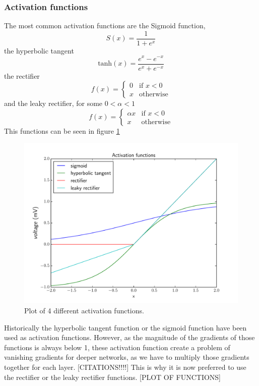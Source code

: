 \documentclass[12pt,a4paper,twoside,openright]{report}
\begin{document}
\subsubsection{Activation functions}
The most common activation functions are the Sigmoid function,
\[S(x) = \frac{1}{1 + e^x}\] the hyperbolic tangent 
\[\textrm{tanh}(x)=\frac{e^x - e^{-x}}{e^x + e^{-x}}\] the rectifier 
\[
f(x) = 
\begin{cases}
	0 & \text{if } x < 0\\
	x & \text{otherwise}
\end{cases}
\]
and the leaky rectifier, for some $0 < \alpha < 1$
\[
f(x) = 
\begin{cases}
	\alpha x & \text{if } x < 0\\
	x & \text{otherwise}
\end{cases}
\]
This functions can be seen in figure \ref{fig:activation_functions}
\begin{figure}
	\centering
	\includegraphics[scale=0.6]{activations}
	\caption{Plot of 4 different activation functions.}
	\label{fig:activation_functions}
\end{figure}
Historically the hyperbolic tangent function or the sigmoid function have been used as activation functions. However, as the magnitude of the gradients of those functions is always below 1, these activation function create a problem of vanishing gradients for deeper networks, as we have to multiply those gradients together for each layer. [CITATIONS!!!!] This is why it is now preferred to use the rectifier or the leaky rectifier functions.
[PLOT OF FUNCTIONS]
\end{document}
